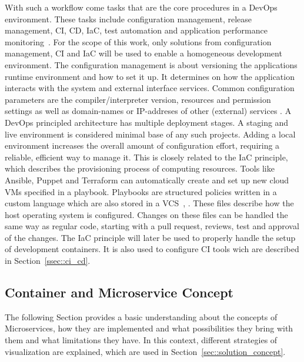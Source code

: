 \documentclass[12pt, a4paper]{article}
\begin{document}
        \noindent With such a workflow come tasks that are the core procedures in a DevOps environment. These tasks include configuration management, release management, \ac{CI}, \ac{CD}, \ac{IaC}, test automation and application performance monitoring~\cite{azuredevops}.\newline
        For the scope of this work, only solutions from configuration management, \ac{CI} and \ac{IaC} will be used to enable a homogeneous development environment. The configuration management is about versioning the applications runtime environment and how to set it up. It determines on how the application interacts with the system and external interface services. Common configuration parameters are the compiler/interpreter version, resources and permission settings as well as domain-names or \acs{IP}-addreses of other (external) services \cite{base_devops}. A DevOps principled architecture has multiple deployment stages. A staging and live environment is considered minimal base of any such projects. Adding a local environment increases the overall amount of configuration effort, requiring a reliable, efficient way to manage it. This is closely related to the \ac{IaC} principle, which describes the provisioning process of computing resources. Tools like Ansible, Puppet and Terraform can automatically create and set up new cloud \ac{VM}s specified in a playbook. Playbooks are structured policies written in a custom language which are also stored in a \ac{VCS}~\cite{ansible2020}, \cite{azuredevops}. These files describe how the host operating system is configured. Changes on these files can be handled the same way as regular code, starting with a pull request, reviews, test and approval of the changes. The \acl{IaC} principle will later be used to properly handle the setup of development containers. It is also used to configure \acs{CI} tools wich are described in Section~\ref{ssec::ci_cd}.

    \subsection{Container and Microservice Concept}\label{ssec::microservices}
    The following Section provides a basic understanding about the concepts of Microservices, how they are implemented and what possibilities they bring with them and what limitations they have. In this context, different strategies of visualization are explained, which are used in Section~\ref{sec::solution_concept}.
\end{document}

